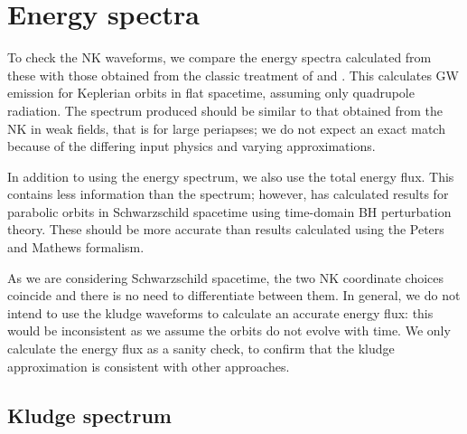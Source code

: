 \section{Energy spectra}\label{sec:Energy}

To check the NK waveforms, we compare the energy spectra calculated from these with those obtained from the classic treatment of \citet{Peters1963} and \citet{Peters1964}. This calculates GW emission for Keplerian orbits in flat spacetime, assuming only quadrupole radiation. The spectrum produced should be similar to that obtained from the NK in weak fields, that is for large periapses; we do not expect an exact match because of the differing input physics and varying approximations.

In addition to using the energy spectrum, we also use the total energy flux. This contains less information than the spectrum; however, \citet{Martel2004} has calculated results for parabolic orbits in Schwarzschild spacetime using time-domain BH perturbation theory. These should be more accurate than results calculated using the Peters and Mathews formalism.

As we are considering Schwarzschild spacetime, the two NK coordinate choices coincide and there is no need to differentiate between them. In general, we do not intend to use the kludge waveforms to calculate an accurate energy flux: this would be inconsistent as we assume the orbits do not evolve with time. We only calculate the energy flux as a sanity check, to confirm that the kludge approximation is consistent with other approaches.

\subsection{Kludge spectrum}

